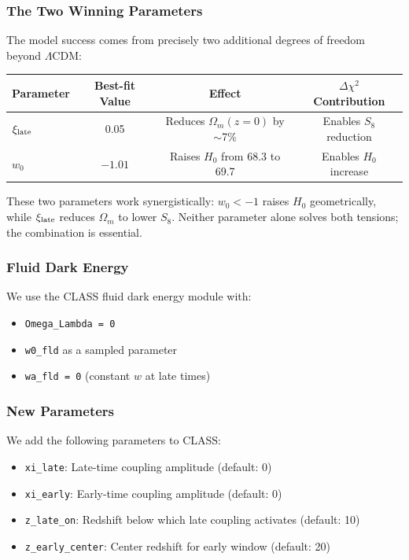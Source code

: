 \documentclass[twocolumn,showpacs,preprintnumbers,amsmath,amssymb,prd]{revtex4-2}
\begin{document}
\subsubsection{The Two Winning Parameters}

The model success comes from precisely two additional degrees of freedom beyond $\Lambda$CDM:
\begin{center}
\begin{tabular}{lccc}
\toprule
Parameter & Best-fit Value & Effect & $\Delta\chi^2$ Contribution \\
\midrule
$\xi_{\rm late}$ & 0.05 & Reduces $\Omega_m(z=0)$ by $\sim$7\% & Enables $S_8$ reduction \\
$w_0$ & $-1.01$ & Raises $H_0$ from 68.3 to 69.7 & Enables $H_0$ increase \\
\bottomrule
\end{tabular}
\end{center}

These two parameters work synergistically: $w_0 < -1$ raises $H_0$ geometrically, while $\xi_{\rm late}$ reduces $\Omega_m$ to lower $S_8$. Neither parameter alone solves both tensions; the combination is essential.

\subsubsection{Fluid Dark Energy}

We use the CLASS fluid dark energy module with:
\begin{itemize}
    \item \texttt{Omega\_Lambda = 0}
    \item \texttt{w0\_fld} as a sampled parameter
    \item \texttt{wa\_fld = 0} (constant $w$ at late times)
\end{itemize}

\subsubsection{New Parameters}

We add the following parameters to CLASS:
\begin{itemize}
    \item \texttt{xi\_late}: Late-time coupling amplitude (default: 0)
    \item \texttt{xi\_early}: Early-time coupling amplitude (default: 0)
    \item \texttt{z\_late\_on}: Redshift below which late coupling activates (default: 10)
    \item \texttt{z\_early\_center}: Center redshift for early window (default: 20)
\end{itemize}
\end{document}
